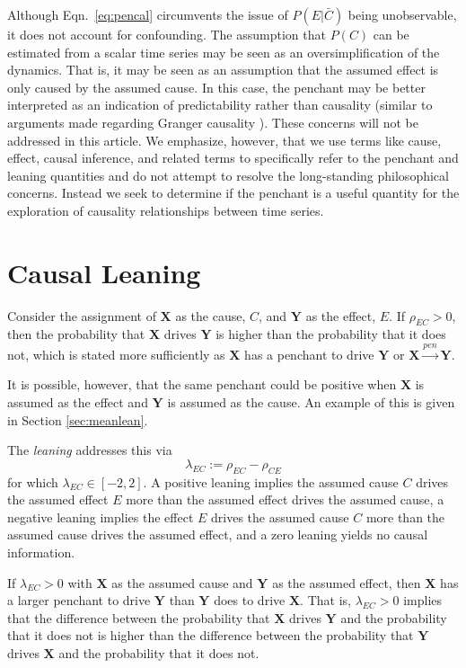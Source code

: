 \documentclass[twocolumn,aps,pre,groupedaddress]{revtex4-1}
\begin{document}
Although Eqn.\ \ref{eq:pencal} circumvents the issue of $P(E|\bar{C})$ being unobservable, it does not account for confounding.  The assumption  that $P(C)$ can be estimated from a scalar time series may be seen as an oversimplification of the dynamics.  That is, it may be seen as an assumption that the assumed effect is only caused by the assumed cause.  In this case, the penchant may be better interpreted as an indication of predictability rather than causality (similar to arguments made regarding Granger causality \cite{Sugihara2012}).  These concerns will not be addressed in this article.  We emphasize, however, that we use terms like cause, effect, causal inference, and related terms to specifically refer to the penchant and leaning quantities and do not attempt to resolve the long-standing philosophical concerns.  Instead we seek to determine if the penchant is a useful quantity for the exploration of causality relationships between time series.

\section{Causal Leaning}
Consider the assignment of $\mathbf{X}$ as the cause, $C$, and $\mathbf{Y}$ as the effect, $E$.  If $\rho_{EC}>0$, then the probability that $\mathbf{X}$ drives $\mathbf{Y}$ is higher than the probability that it does not, which is stated more sufficiently as $\mathbf{X}$ has a penchant to drive $\mathbf{Y}$ or $\mathbf{X}\xrightarrow{pen}\mathbf{Y}$.  

It is possible, however, that the same penchant could be positive when $\mathbf{X}$ is assumed as the effect and $\mathbf{Y}$ is assumed as the cause.  An example of this is given in Section \ref{sec:meanlean}.

The {\em leaning} addresses this via
\begin{equation}
\label{eq:leaning}
\lambda_{EC} := \rho_{EC} - \rho_{CE}
\end{equation}
for which $\lambda_{EC}\in\left[-2,2\right]$. A positive leaning implies the assumed cause $C$ drives the assumed effect $E$ more than the assumed effect drives the assumed cause, a negative leaning implies the effect $E$ drives the assumed cause $C$ more than the assumed cause drives the assumed effect, and a zero leaning yields no causal information.  

If $\lambda_{EC}>0$ with $\mathbf{X}$ as the assumed cause and $\mathbf{Y}$ as the assumed effect, then $\mathbf{X}$ has a larger penchant to drive $\mathbf{Y}$ than $\mathbf{Y}$ does to drive $\mathbf{X}$.  That is, $\lambda_{EC}>0$ implies that the difference between the probability that $\mathbf{X}$ drives $\mathbf{Y}$ and the probability that it does not is higher than the difference between the probability that $\mathbf{Y}$ drives $\mathbf{X}$ and the probability that it does not.  
\end{document}
